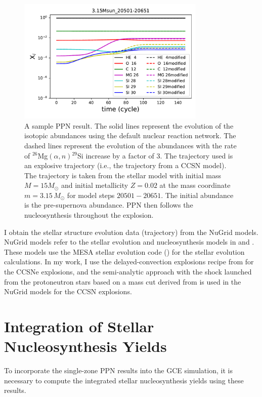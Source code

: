 \documentclass{brandeis-thesis3.2}
\def \msun {M_{\odot}}
\newcommand{\iso}[2]{$^{#1}${#2}}
\begin{document}
\begin{figure}[h]
\centering
\includegraphics[width=0.8\textwidth]{figs/ppn_sample.pdf}
\caption{A sample PPN result. The solid lines represent the evolution of the isotopic abundances using the default nuclear reaction network. The dashed lines represent the evolution of the abundances with the rate of \iso{26}{Mg}$(\alpha,n)$\iso{29}{Si} increase by a factor of 3. The trajectory used is an explosive trajectory (i.e., the trajectory from a CCSN model). The trajectory is taken from the stellar model with initial mass $M=15\msun$ and initial metallicity $Z=0.02$ at the mass coordinate $m=3.15\,\msun$ for model steps $20501-20651$. The initial abundance is the pre-supernova abundance. PPN then follows the nucleosynthesis throughout the explosion.}
\label{fig:ppn_sample}
\end{figure}

I obtain the stellar structure evolution data (trajectory) from the NuGrid models. NuGrid models refer to the stellar evolution and nucleosynthesis models in \cite{Pignatari_2016} and \cite{Ritter_2018}. These models use the MESA stellar evolution code (\citealt{Paxton_2011}) for the stellar evolution calculations. In my work, I use the delayed-convection explosions recipe from \cite{Fryer_2012} for the CCSNe explosions, and the semi-analytic approach with the shock launched from the protoneutron stars based on a mass cut derived from \cite{Fryer_2012} is used in the NuGrid models for the CCSN explosions.



\section{Integration of Stellar Nucleosynthesis Yields} \label{yield}
To incorporate the single-zone PPN results into the GCE simulation, it is necessary to compute the integrated stellar nucleosynthesis yields using these results.
\end{document}
